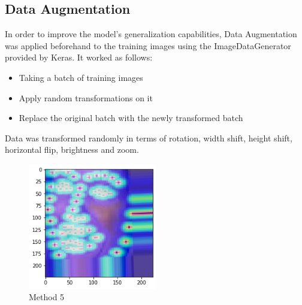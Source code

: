 \subsection{Data Augmentation}
In order to improve the model's generalization capabilities, Data Augmentation was applied beforehand to the training images using the ImageDataGenerator provided by Keras. It worked as follows:
\begin{itemize}
    \item Taking a batch of training images
    \item Apply random transformations on it
    \item Replace the original batch with the newly transformed batch
\end{itemize}
Data was transformed randomly in terms of rotation, width shift, height shift, horizontal flip, brightness and zoom.

\begin{center}
\begin{figure}[H]
  \begin{center}
  \includegraphics[angle=0, width=0.5\textwidth]{Figures/method_5.png}
  \caption{Method 5}
  \label{fig:MachineLearningModelMethod_5}
  \end{center}
\end{figure}
\end{center}


